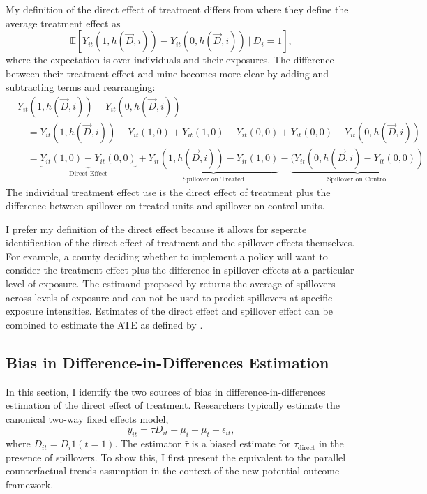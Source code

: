 \documentclass[11pt]{article}
\begin{document}
My definition of the direct effect of treatment differs from \citet{Sävje_Aronow_Hudgens_2019} where they define the average treatment effect as \[ 
    \mathbb{E} \left[ Y_{it}(1, h(\vec{D}, i)) - Y_{it}(0, h(\vec{D}, i)) \ \vert \ D_i = 1 \right],
\] 
where the expectation is over individuals and their exposures. The difference between their treatment effect and mine becomes more clear by adding and subtracting terms and rearranging:
\begin{align*}
    &Y_{it}(1, h(\vec{D}, i)) - Y_{it}(0, h(\vec{D}, i)) \\
    &\quad = Y_{it}(1, h(\vec{D}, i)) - Y_{it}(1, 0) + Y_{it}(1, 0) - Y_{it}(0,0) + Y_{it}(0,0) - Y_{it}(0, h(\vec{D}, i)) \\
    &\quad = \underbrace{Y_{it}(1, 0) - Y_{it}(0,0)}_{\text{Direct Effect}} + \underbrace{Y_{it}(1, h(\vec{D}, i)) - Y_{it}(1, 0)}_{\text{Spillover on Treated}} - \underbrace{(Y_{it}(0, h(\vec{D}, i) - Y_{it}(0,0))}_{\text{Spillover on Control}} 
\end{align*}
The individual treatment effect \citet{Sävje_Aronow_Hudgens_2019} use is the direct effect of treatment plus the difference between spillover on treated units and spillover on control units. 

I prefer my definition of the direct effect because it allows for seperate identification of the direct effect of treatment and the spillover effects themselves. For example, a county deciding whether to implement a policy will want to consider the treatment effect plus the difference in spillover effects at a particular level of exposure. The estimand proposed by \citet{Sävje_Aronow_Hudgens_2019} returns the average of spillovers across levels of exposure and can not be used to predict spillovers at specific exposure intensities. Estimates of the direct effect and spillover effect can be combined to estimate the ATE as defined by \citet{Sävje_Aronow_Hudgens_2019}.




\subsection{Bias in Difference-in-Differences Estimation}

In this section, I identify the two sources of bias in difference-in-differences estimation of the direct effect of treatment. Researchers typically estimate the canonical two-way fixed effects model, 
\begin{equation}\label{eq:twfe}    
    y_{it} = \tau D_{it} + \mu_i + \mu_t + \epsilon_{it},
\end{equation}
where $D_{it} = D_i 1(t=1)$. The estimator $\hat{\tau}$ is a biased estimate for $\tau_{\text{direct}}$ in the presence of spillovers. To show this, I first present the equivalent to the parallel counterfactual trends assumption in the context of the new potential outcome framework. 
\end{document}
